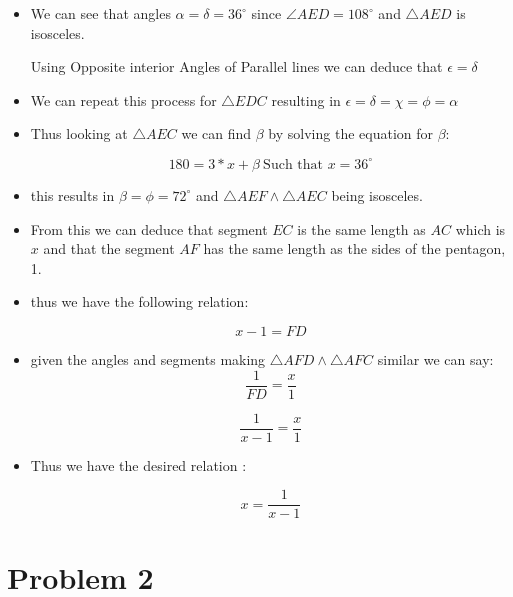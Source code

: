 \documentclass[]{report}
\begin{document}
\begin{itemize}

\item We can see that angles $\alpha = \delta = 36^{\circ} $ since $\angle AED = 108^{\circ} $ and $\triangle AED $ is isosceles.  

\subitem Using Opposite interior Angles of Parallel lines we can deduce that $\epsilon = \delta$

\item We can repeat this process for $\triangle EDC$ resulting in $\epsilon = \delta = \chi  = \phi = \alpha  $

\item Thus looking at $\triangle AEC $ we can find $\beta$ by solving the equation for $\beta$:
	
	
	$$ 180 = 3 *x + \beta \  \text{Such that } x = 36^{\circ} $$
	
	\item this results in $\beta = \phi  = 72^{\circ}$ and $\triangle AEF \land \triangle AEC$ being isosceles.  
	
	\item From this we can deduce that segment $EC$ is the same length as $AC$ which is $x$ and that the segment $AF$ has the same length as the sides of the pentagon, 1.
	
	\item thus we have the following relation:
	
	$$ x -1 =  FD$$
	
	\item given the angles and segments making  $\triangle AFD \land \triangle AFC$ similar we can  say:
	$$ \frac{1}{FD} = \frac{x}{1} $$
	
	$$ \frac{1}{x - 1} = \frac{x}{1} $$
	
	\item Thus we have  the desired relation :
	
	
	$$ x = \frac{1}{x - 1} $$
	

\end{itemize}

\begin{flushright}
\smiley{}
\end{flushright}





\section{Problem 2}
\end{document}
